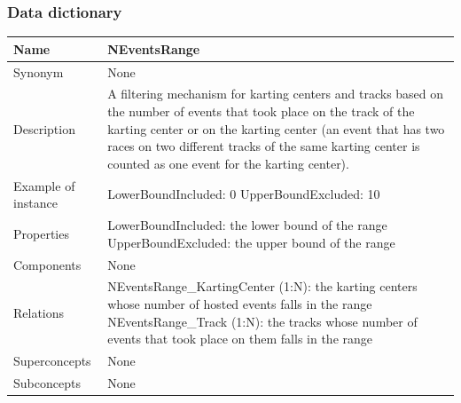 \documentclass{beamer}
\begin{document}
\begin{frame}
    \frametitle{Data dictionary}
    \begin{table}
    \tiny
    \begin{tabular}{|p{2cm}|p{6cm}|}
    \hline
    Name & \textbf{NEventsRange} \\
    \hline
    Synonym & None \\
    \hline
    Description & A filtering mechanism for karting centers and tracks based on the number of
    events that took place on the track of the karting center or on the karting center
    (an event that has two races on two different tracks of the same karting center 
    is counted as one event for the karting center). \\
    \hline
    Example of instance &
    LowerBoundIncluded: 0 \newline
    UpperBoundExcluded: 10 \\
    \hline
    Properties &
    LowerBoundIncluded: the lower bound of the range \newline
    UpperBoundExcluded: the upper bound of the range \\
    \hline
    Components & None \\
    \hline
    Relations &
    NEventsRange\_KartingCenter (1:N): the karting centers whose number of hosted events falls in the range \newline
    NEventsRange\_Track (1:N): the tracks whose number of events that took place on them falls in the range \\
    \hline
    Superconcepts & None \\
    \hline
    Subconcepts & None \\
    \hline
    \end{tabular}
    \end{table}
\end{frame}
\end{document}
